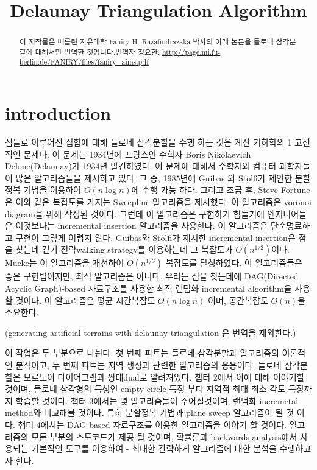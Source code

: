 \documentclass{article}
\title{Delaunay Triangulation Algorithm}
\begin{document}
\maketitle
\begin{abstract}
    이 저작물은 베를린 자유대학 Faniry H. Razafindrazaka 박사의 아래 논문을
    들로네 삼각분할에 대해서만 번역한 것입니다.번역자 정요한. 
    \url{http://page.mi.fu-berlin.de/FANIRY/files/faniry_aims.pdf}
\end{abstract}
\section{introduction}
점들로 이루어진 집합에 대해 들로네 삼각분할을 수행 하는 것은 계산 기하학의 1
고전적인 문제다. 이 문제는 1934년에 프랑스인 수학자 Boris Nikolaevich Delone(Delaunay)가
1934년 발견하였다. 이 문제에 대해서 수학자와 컴퓨터 과학자들이 많은 
알고리즘들을 제시하고 있다. 그 중, 1985년에 Guibas 와 Stolfi가 제안한 
분할정복 기법을 이용하여 $O ( n \log n)$에 수행 가능 하다. 
그리고 조금 후, Steve Fortune은 이와 같은 복잡도를 가지는 Sweepline 알고리즘을 
제시했다. 이 알고리즘은 voronoi diagram을 위해 작성된 것이다. 
그런데 이 알고리즘은 구현하기 힘들기에 엔지니어들은 이것보다는 
incremental insertion 알고리즘을 사용한다. 이 알고리즘은  
단순명료하고 구현이 그렇게 어렵지 않다. Guibas와 Stolfi가 제시한 
incremental insertion은 점을 찾는데 걷기 전략walking strategy를 이용하는데 
그 복잡도가 $O(n^{1/2})$이다. Mucke는 이 알고리즘을 개선하여 $O(n^{1/3})$
복잡도를 달성하였다. 이 알고리즘들은 좋은 구현법이지만, 최적 알고리즘은 아니다. 
우리는 점을 찾는데에 DAG(Directed Acyclic Graph)-based 자료구조를 사용한 
최적 랜덤화 incremental algorithm을 사용할 것이다. 이 알고리즘은 평균 시간복잡도 
$O(n \log n)$ 이며, 공간복잡도 $O(n)$을 소요한다. 

(generating artificial terrains with delaunay triangulation 은 번역을 제외한다.)

이 작업은 두 부분으로 나뉜다. 첫 번째 파트는 들로네 삼각분할과 알고리즘의 
이론적인 분석이고, 두 번째 파트는 지역 생성과 관련한 알고리즘의 응용이다. 
들로네 삼각분할은 보로노이 다이어그램과 쌍대dual로 알려져있다. 챕터 2에서 
이에 대해 이야기할 것이며, 들로네 삼각형의 특성인 empty circle 특징 부터 
지역적 최대-최소 각도 특징까지 학습할 것이다. 챕터 3에서는 몇 알고리즘들이 
주어질것이며, 랜덤화 incremetal method와 비교해볼 것이다. 특히 분할정복 기법과
plane sweep 알고리즘이 될 것 이다. 챕터 4에서는 DAG-based 자료구조를 이용한 
알고리즘을 이야기 할 것이다. 알고리즘의 모든 부분의 스도코드가 제공 될 것이며, 
확률론과 backwards analysis에서 사용되는 기본적인 도구를 이용하여 - 최대한 
간략하게 알고리즘에 대한 분석을 수행하고자 한다. 
\pagebreak
\end{document}

